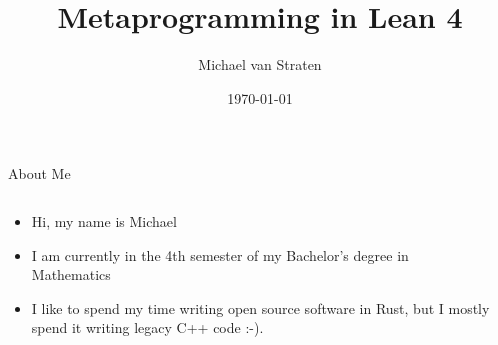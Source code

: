 \documentclass{beamer}
\title{Metaprogramming in Lean 4}
\author{Michael van Straten}
\date{\today}
\institute{Humboldt-Universität zu Berlin}
\begin{document}
\NoHyper

\begin{frame}{About Me}
    \begin{columns}
        \begin{column}{0.5\textwidth}
            \begin{itemize}[<+(0)->]
                \item Hi, my name is Michael
                \item I am currently in the 4th semester of my Bachelor's
                      degree in Mathematics
                \item I like to spend my time writing open source software in
                      Rust, but I mostly spend it writing legacy C++ code :-).
            \end{itemize}
        \end{column}
        \begin{column}{0.5\textwidth}
            \begin{center}
            \end{center}
        \end{column}
    \end{columns}

\end{frame}
\end{document}
